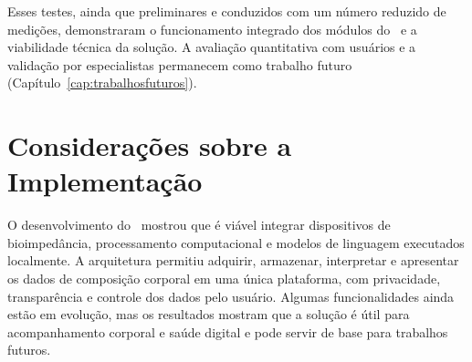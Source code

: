 Esses testes, ainda que preliminares e conduzidos com um número reduzido de medições,
demonstraram o funcionamento integrado dos módulos do \sintonia\ e a viabilidade técnica da
solução. A avaliação quantitativa com usuários e a validação por especialistas permanecem
como trabalho futuro (Capítulo~\ref{cap:trabalhosfuturos}).

\section{Considerações sobre a Implementação}

O desenvolvimento do \sintonia\ mostrou que é viável integrar dispositivos de bioimpedância,
processamento computacional e modelos de linguagem executados localmente. A arquitetura
permitiu adquirir, armazenar, interpretar e apresentar os dados de composição corporal em
uma única plataforma, com privacidade, transparência e controle dos dados pelo usuário.
Algumas funcionalidades ainda estão em evolução, mas os resultados mostram que a solução é
útil para acompanhamento corporal e saúde digital e pode servir de base para trabalhos
futuros.
